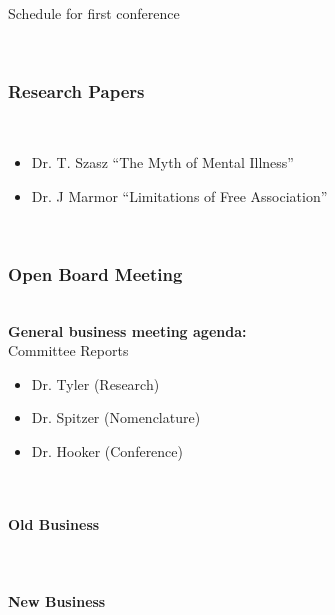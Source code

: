 \begin{refsection}
\begin{apatextbox}{Schedule for first conference}
\begin{enumerate}
\end{enumerate}

\\

\subsubsection{Research Papers}
\label{researchpapers}

\\

\begin{itemize}
\item Dr. T. Szasz “The Myth of Mental Illness”

\item Dr. J Marmor “Limitations of Free Association”

\end{itemize}

\\

\subsubsection{Open Board Meeting}
\label{openboardmeeting}

\\

\textbf{General business meeting agenda:} \\

Committee Reports \\

\begin{itemize}
\item Dr. Tyler (Research)

\item Dr. Spitzer (Nomenclature)

\item Dr. Hooker (Conference)

\end{itemize}

\\

\paragraph{Old Business}
\label{oldbusiness}

\\

\paragraph{New Business}
\label{newbusiness}


\end{apatextbox}
\end{refsection}
